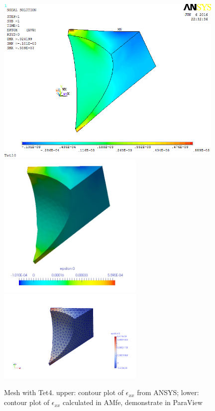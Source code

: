 \begin{figure}[htbp]
	\begin{center}
		\includegraphics[width=11cm,clip]{Tet4Exx.png} 	
		\includegraphics[width=7cm,clip]{Tet4ExxPD.png} 			
		\includegraphics[width=7cm,clip]{Tet4ExxP.png} 		
		\caption{Mesh with Tet4. upper: contour plot of $\epsilon_{xx}$ from ANSYS; lower: contour plot of $\epsilon_{xx}$ calculated in AMfe, demonstrate in ParaView} \label{fig: Tet4Exx}
	\end{center}
\end{figure}
\clearpage 

